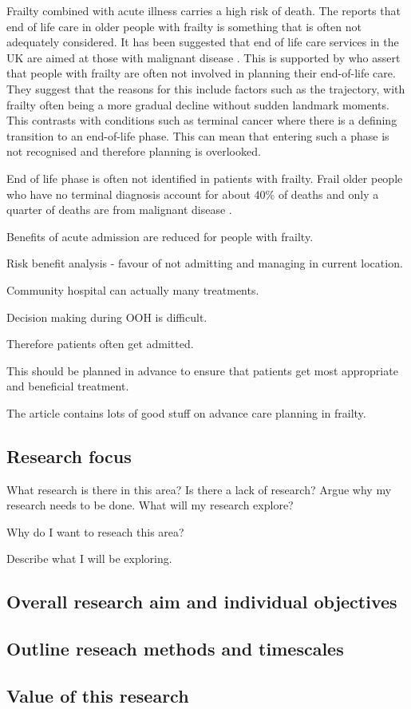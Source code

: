 \documentclass
[
	12pt,
	a4paper,
	oneside,
]{article}
\begin{document}
Frailty combined with acute illness carries a high risk of death. 
The \textcite{silver:12} reports that end of life care in older people with frailty
is something that is often not adequately considered. It has been suggested that 
end of life care services in the UK are aimed at those with malignant 
disease \parencite{sharp:13}.
This is supported by \textcite{oliver:14} who assert that people with frailty 
are often not involved in planning their 
end-of-life care. They suggest that the reasons for this include factors such as
the trajectory, with frailty often being a more gradual decline without sudden 
landmark moments. This contrasts with conditions such as terminal cancer where there 
is a defining transition to an end-of-life phase. This can mean that entering such a
phase is not recognised and therefore planning is overlooked. 


End of life phase is often not identified in patients with frailty. 
Frail older people who have no terminal diagnosis account for about 40\% of 
deaths and only a quarter of deaths are from malignant disease \parencite{sharp:13}.

Benefits of acute admission are reduced for people with frailty.

Risk benefit analysis - favour of not admitting and managing in current location.

Community hospital can actually many treatments.

Decision making during OOH is difficult.

Therefore patients often get admitted.

This should be planned in advance to ensure that patients get most appropriate 
and beneficial treatment. 

The article \textcite{sharp:13} contains lots of good
stuff on advance care planning in frailty.

\subsection{Research focus}
What research is there in this area? 
Is there a lack of research? 
Argue why my research needs to be done.
What will my research explore? 

Why do I want to reseach this area?

Describe what I will be exploring.

\subsection{Overall research aim and individual objectives}

\subsection{Outline reseach methods and timescales}

\subsection{Value of this research}

\clearpage
\printbibliography
\end{document}

